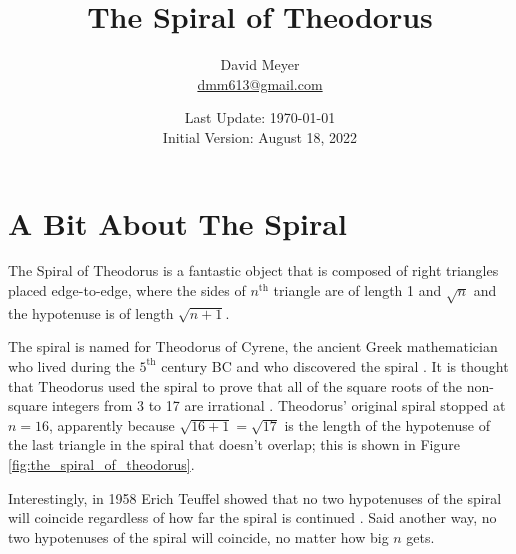 \documentclass{article}
\title{The Spiral of Theodorus}
\author{David Meyer \\ \href{mailto:dmm613@gmail.com}
                            {dmm613@gmail.com}}
\date{Last Update: \today \\
	 {\vspace{1.00mm} \small Initial Version: August 18, 2022}}
\theoremstyle{definition}
\begin{document}
\maketitle
%
%
%
\section{A Bit About The Spiral}
\label{sec:spiral_of_theodorus}
The Spiral of Theodorus is a 
fantastic object that is composed of right
triangles placed edge-to-edge, where the sides of $n^{\text{th}}$
triangle are of length 1 and $\sqrt{n}$ and the hypotenuse is of
length $\sqrt{n+1}$.

\bigskip
\noindent
The spiral is named for Theodorus of Cyrene, the ancient Greek
mathematician who lived during the $5^{\text{th}}$ century BC and
who discovered the spiral \cite{wiki:theodorus_of_cyrene}. It is
thought that Theodorus used the spiral to prove that all of the 
square roots of the non-square integers from 3 to 17 are irrational 
\cite{wiki:spiral_of_theodorus}. Theodorus' original spiral stopped 
at $n = 16$, apparently because $\sqrt{16+1} = \sqrt{17}$ is the 
length of the hypotenuse of the last triangle in the spiral that
doesn't overlap; this is shown in Figure \ref{fig:the_spiral_of_theodorus}.

\bigskip
\noindent
Interestingly, in 1958 Erich Teuffel showed that no two hypotenuses
of the spiral will coincide regardless of how far the spiral
is continued \cite{wurzelschnecke}. Said another way, no two
hypotenuses of the spiral will coincide, no matter how big $n$
gets.
\end{document}
